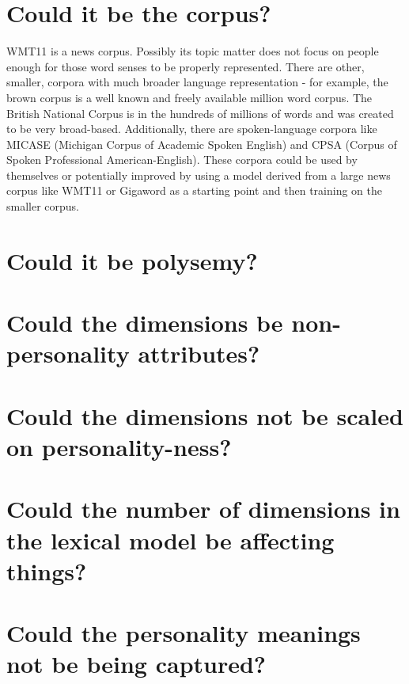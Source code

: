 \documentclass[eric_thesis.tex]{subfiles}
\begin{document}
\section{Could it be the corpus?}

WMT11 is a news corpus. Possibly its topic matter does not focus on people enough for those word senses to be properly represented. There are other, smaller, corpora with much broader language representation - for example, the brown corpus is a well known and freely available million word corpus. The British National Corpus is in the hundreds of millions of words and was created to be very broad-based. Additionally, there are spoken-language corpora like MICASE (Michigan Corpus of Academic Spoken English) and CPSA (Corpus of Spoken Professional American-English). These corpora could be used by themselves or potentially improved by using a model derived from a large news corpus like WMT11 or Gigaword as a starting point and then training on the smaller corpus.

\section{Could it be polysemy?}

\section{Could the dimensions be non-personality attributes?}
\section{Could the dimensions not be scaled on personality-ness?}


\section{Could the number of dimensions in the lexical model be affecting things?}

\section{Could the personality meanings not be being captured?}

\end{document}
